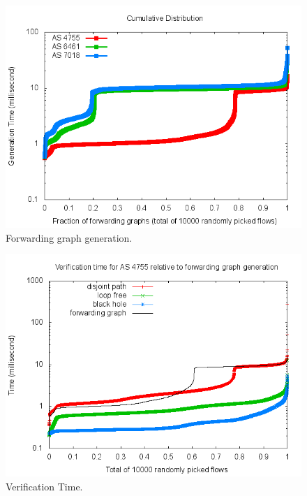\begin{figure}
  \centering
  \includegraphics[width=1\linewidth]{figures/fg_cdf_10000.png}
  \caption{Forwarding graph generation.}
  \label{fig:init}
\end{figure}

\begin{figure}
  \centering
  \includegraphics[width=1\linewidth]{figures/verify_cdf10000.png}
  \caption{Verification Time.}
  \label{fig:init}
\end{figure}

